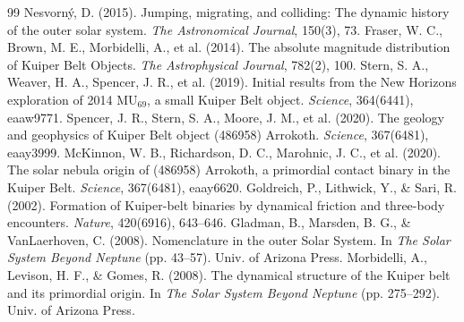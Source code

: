 \documentclass[11pt,a4paper]{article}
\begin{document}
\begin{thebibliography}{99}
 Nesvorn\'y, D. (2015). Jumping, migrating, and colliding: The dynamic history of the outer solar system. \textit{The Astronomical Journal}, 150(3), 73.
 Fraser, W. C., Brown, M. E., Morbidelli, A., et al. (2014). The absolute magnitude distribution of Kuiper Belt Objects. \textit{The Astrophysical Journal}, 782(2), 100.
 Stern, S. A., Weaver, H. A., Spencer, J. R., et al. (2019). Initial results from the New Horizons exploration of 2014 $\text{MU}_{69}$, a small Kuiper Belt object. \textit{Science}, 364(6441), eaaw9771.
 Spencer, J. R., Stern, S. A., Moore, J. M., et al. (2020). The geology and geophysics of Kuiper Belt object (486958) Arrokoth. \textit{Science}, 367(6481), eaay3999.
 McKinnon, W. B., Richardson, D. C., Marohnic, J. C., et al. (2020). The solar nebula origin of (486958) Arrokoth, a primordial contact binary in the Kuiper Belt. \textit{Science}, 367(6481), eaay6620.
 Goldreich, P., Lithwick, Y., \& Sari, R. (2002). Formation of Kuiper-belt binaries by dynamical friction and three-body encounters. \textit{Nature}, 420(6916), 643--646.
 Gladman, B., Marsden, B. G., \& VanLaerhoven, C. (2008). Nomenclature in the outer Solar System. In \textit{The Solar System Beyond Neptune} (pp. 43--57). Univ. of Arizona Press.
 Morbidelli, A., Levison, H. F., \& Gomes, R. (2008). The dynamical structure of the Kuiper belt and its primordial origin. In \textit{The Solar System Beyond Neptune} (pp. 275--292). Univ. of Arizona Press.
\end{thebibliography}
\end{document}
